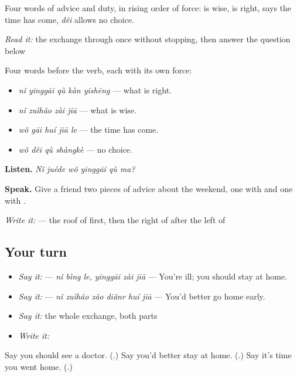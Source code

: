 Four words of advice and duty, in rising order of force:  is wise,  is right,  says the time has come, \emph{děi} allows no choice.

\begin{tcolorbox}[breakable,skin=enhanced,colback=orange!6,colframe=orange!45!black,boxrule=0.5pt,arc=1mm,left=6pt,right=6pt,top=4pt,bottom=4pt,fonttitle=\bfseries,title={Read this}]
\emph{Read it:} the exchange through once without stopping, then answer the question below
\end{tcolorbox}

\begin{grammarlens}[title={What you've built — advice and duty}]
Four words before the verb, each with its own force:

\begin{itemize}
\raggedright
  \item \textbf{} \emph{nǐ yīnggāi qù kàn yīshēng} — what is right.
  \item \textbf{} \emph{nǐ zuìhǎo zài jiā} — what is wise.
  \item \textbf{} \emph{wǒ gāi huí jiā le} — the time has come.
  \item \textbf{} \emph{wǒ děi qù shàngkè} — no choice.
\end{itemize}

\textbf{Listen.} \emph{Nǐ juéde wǒ yīnggāi qù ma?}

\textbf{Speak.} Give a friend two pieces of advice about the weekend, one with  and one with .

\emph{Write it:}  — the roof of  first, then the right of  after the left of 
\end{grammarlens}

\subsection*{Your turn}
\begin{itemize}
\raggedright
  \item \emph{Say it:}   — \emph{nǐ bìng le, yīnggāi zài jiā} — You're ill; you should stay at home.
  \item \emph{Say it:}  — \emph{nǐ zuìhǎo zǎo diǎnr huí jiā} — You'd better go home early.
  \item \emph{Say it:} the whole exchange, both parts
  \item \emph{Write it:} 
\end{itemize}

\begin{tcolorbox}[breakable,colback=teal!4,colframe=teal!35!black,title={Before you move on}]
Say you should see a doctor. (\textbf{}.) Say you'd better stay at home. (\textbf{}.) Say it's time you went home. (\textbf{}.)
\end{tcolorbox}
